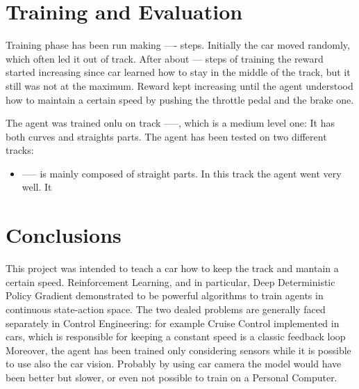 \documentclass[Lau,oneside,noexaminfo]{sapthesis} %
\begin{document}
\chapter{Training and Evaluation}
Training phase has been run making ---- steps. Initially the car moved randomly, which often led it out of track. After about --- steps of training the reward started increasing since car learned how to stay in the middle of the track, but it still was not at the maximum. Reward kept increasing until the agent understood how to maintain a certain speed by pushing the throttle pedal and the brake one.

The agent was trained onlu on track -----, which is a medium level one: It has both curves and straights parts. \newline
The agent has been tested on two different tracks:
\begin{itemize}
  \item ----- is mainly composed of straight parts. In this track the agent went very well. It 
\end{itemize}
\chapter{Conclusions}
This project was intended to teach a car how to keep the track and mantain a certain speed. Reinforcement Learning, and in particular, Deep Deterministic Policy Gradient demonstrated to be powerful algorithms to train agents in continuous state-action space. \newline 
The two dealed problems are generally faced separately in Control Engineering: for example Cruise Control implemented in cars, which is responsible for keeping a constant speed is a classic feedback loop  \newline
Moreover, the agent has been trained only considering sensors while it is possible to use also the car vision. Probably by using car camera the model would have been better but slower, or even not possible to train on a Personal Computer.
\backmatter

\cleardoublepage
{} %
{}

\end{document}
